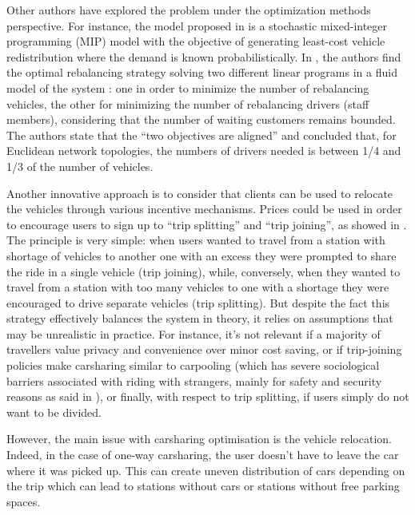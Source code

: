 \begin{bibunit}[ieeetr]
\medskip
Other authors have explored the problem under the optimization methods perspective.
For instance, the model proposed in \cite{nair_fleet_2011} is a stochastic mixed-integer programming (MIP) model with the objective of generating least-cost vehicle redistribution where the demand is known probabilistically.
In \cite{smith_rebalancing_2013}, the authors find the optimal rebalancing strategy solving two different linear programs in a fluid model of the system : one in order to minimize the number of rebalancing vehicles, the other for minimizing the number of rebalancing drivers (staff members), considering that the number of waiting customers remains bounded.
The authors state that the ``two objectives are aligned'' and concluded that, for Euclidean network topologies, the numbers of drivers needed is between 1/4 and 1/3 of the number of vehicles.

\medskip
Another innovative approach is to consider that clients can be used to relocate the vehicles through various incentive mechanisms.
Prices could be used in order to encourage users to sign up to ``trip splitting'' and ``trip joining'', as showed in \cite{barth_user_based_2004}.
The principle is very simple: when users wanted to travel from a station with shortage of vehicles to another one with an excess they were prompted to share the ride in a single vehicle (trip joining), while, conversely, when they wanted to travel from a station with too many vehicles to one with a shortage they were encouraged to drive separate vehicles (trip splitting).
But despite the fact this strategy effectively balances the system in theory, it relies on assumptions that may be unrealistic in practice.
For instance, it's not relevant if a majority of travellers value privacy and convenience over minor cost saving, or if trip-joining policies make carsharing similar to carpooling (which has severe sociological barriers associated with riding with strangers, mainly for safety and security reasons as said in \cite{chan_ridesharing_2012, correia_carpooling_2011}), or finally, with respect to trip splitting, if users simply do not want to be divided.

However, the main issue with carsharing optimisation is the vehicle relocation.
Indeed, in the case of one-way carsharing, the user doesn't have to leave the car where it was picked up.
This can create uneven distribution of cars depending on the trip which can lead to stations without cars or stations without free parking spaces.


\end{bibunit}
